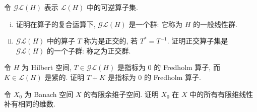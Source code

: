 \documentclass[../../main.tex]{subfiles}
\begin{document}
\begin{exercise}\label{exercise:ch16-64}
令 $\mathcal{G}\mathcal{L}(H)$ 表示 $\mathcal{L}(H)$ 中的可逆算子集.
\begin{enumerate}[(i)]
\item 证明在算子的复合运算下, $\mathcal{G}\mathcal{L}(H)$ 是一个群: 它称为 $H$ 的一般线性群.
\item $\mathcal{G}\mathcal{L}(H)$ 中的算子 $T$ 称为是正交的, 若 $T^{*}=T^{-1}$. 证明正交算子集是 $\mathcal{G}\mathcal{L}(H)$ 的一个子群: 称之为正交群.
\end{enumerate}
\end{exercise}

\begin{exercise}\label{exercise:ch16-65}
令 $H$ 为 Hilbert 空间, $T\in\mathcal{G}\mathcal{L}(H)$ 是指标为 $0$ 的 Fredholm 算子, 而 $K\in\mathcal{L}(H)$ 是紧的. 证明 $T+K$ 是指标为 $0$ 的 Fredholm 算子.
\end{exercise}

\begin{exercise}\label{exercise:ch16-66}
令 $X_{0}$ 为 Banach 空间 $X$ 的有限余维子空间. 证明 $X_{0}$ 在 $X$ 中的所有有限维线性补有相同的维数.
\end{exercise}
\end{document}
